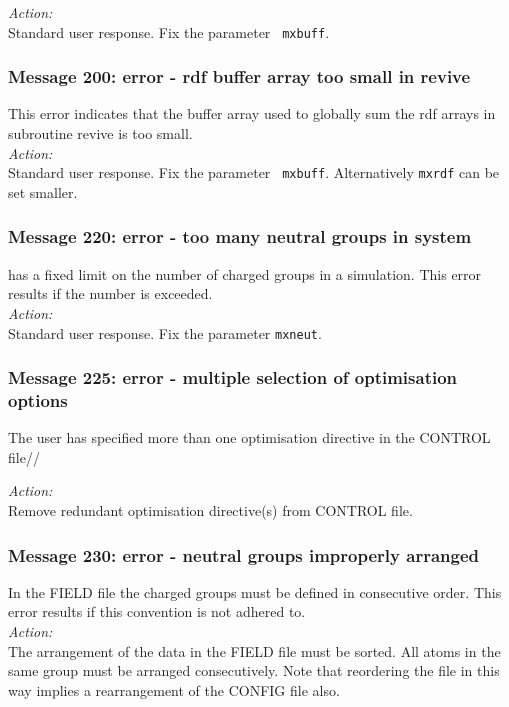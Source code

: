 \noindent
{\em Action:} \\ Standard user response. Fix the parameter {\tt
mxbuff}.

\subsubsection*{Message 200: error - rdf buffer array too small in
revive}

This error indicates that the buffer array used to globally sum the
rdf arrays in subroutine {\sc revive} is too small. \\

\noindent
{\em Action:} \\ Standard user response. Fix the parameter {\tt
mxbuff}.  Alternatively {\tt mxrdf} can be set smaller.


\subsubsection*{Message 220: error - too many neutral groups in system}

\D{} has a fixed limit on the number of charged groups  in a simulation.
This error results if the number is exceeded. \\

\noindent
{\em Action:} \\
Standard user response. Fix the parameter {\tt mxneut}.

\subsubsection*{Message 225: error - multiple selection of optimisation options}

The user has specified more than one optimisation directive in the
CONTROL file//

\noindent
{\em Action:} \\
Remove redundant optimisation directive(s) from CONTROL file.

\subsubsection*{Message 230: error - neutral groups improperly
arranged}

In the \D{} FIELD file the charged groups  must be defined in
consecutive order. This error results if this convention is not
adhered to.\\

\noindent
{\em Action:} \\
The arrangement of the data in the FIELD file must be sorted. All
atoms in the same group must be arranged consecutively. Note that
reordering the file in this way implies a rearrangement of the
CONFIG file also.

